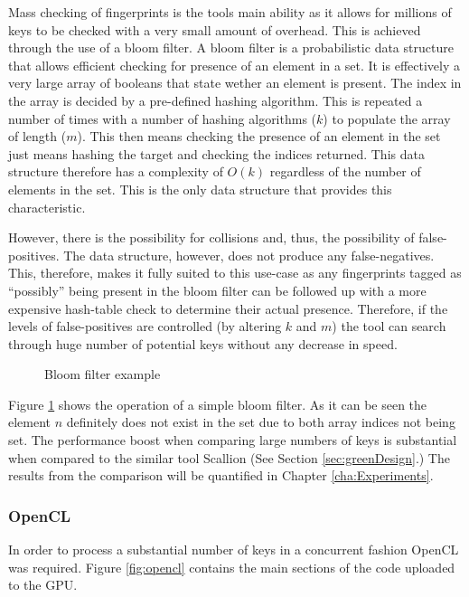 Mass checking of fingerprints is the tools main ability as it allows for millions of keys to be checked with a very small amount of overhead. This is achieved through the use of a bloom filter. A bloom filter is a probabilistic data structure that allows efficient checking for presence of an element in a set. It is effectively a very large array of booleans that state wether an element is present. The index in the array is decided by a pre-defined hashing algorithm. This is repeated a number of times with a number of hashing algorithms ($k$) to populate the array of length ($m$). This then means checking the presence of an element in the set just means hashing the target and checking the indices returned. This data structure therefore has a complexity of $O(k)$ regardless of the number of elements in the set. This is the only data structure that provides this characteristic.

However, there is the possibility for collisions and, thus, the possibility of false-positives. The data structure, however, does not produce any false-negatives. This, therefore, makes it fully suited to this use-case as any fingerprints tagged as ``possibly'' being present in the bloom filter can be followed up with a more expensive hash-table check to determine their actual presence. Therefore, if the levels of false-positives are controlled (by altering $k$ and $m$) the tool can search through huge number of potential keys without any decrease in speed.

\begin{figure}[h!]
    \centering
    
    \caption{Bloom filter example}
    \label{fig:bloom}
\end{figure}

Figure \ref{fig:bloom} shows the operation of a simple bloom filter. As it can be seen the element $n$ definitely does not exist in the set due to both array indices not being set. The performance boost when comparing large numbers of keys is substantial when compared to the similar tool Scallion (See Section \ref{sec:greenDesign}.) The results from the comparison will be quantified in Chapter \ref{cha:Experiments}.

\subsubsection*{OpenCL}

In order to process a substantial number of keys in a concurrent fashion OpenCL was required. Figure \ref{fig:opencl} contains the main sections of the code uploaded to the GPU.

